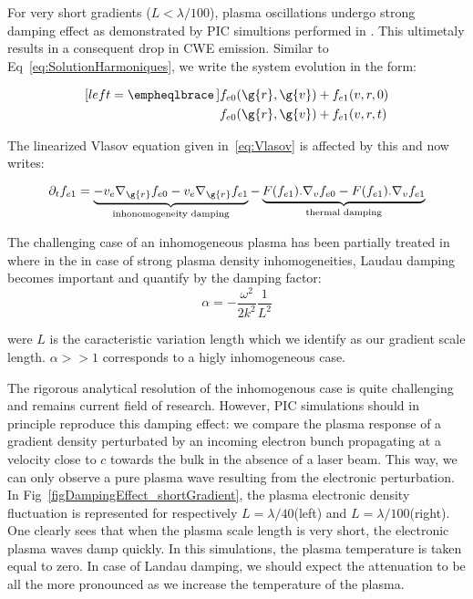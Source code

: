 For very short gradients ($L < \lambda/100$), plasma oscillations undergo strong damping effect as demonstrated by PIC simultions performed in \cite{thaury2010high}. This ultimetaly results in a consequent drop in CWE emission.
Similar to Eq~\ref{eq:SolutionHarmoniques}, we write the system evolution in the form:

\begin{subequations}
\label{eq:SolutionHarmoniquesNH}
\begin{align}[left = \empheqlbrace\,]
&f_{e0}(\g{r},\g{v}) + f_{e1}(v,r,0)\label{eq:SolutionHarmoniquesNH1}\\
&f_{e0}(\g{r},\g{v}) + f_{e1}(v,r,t)\label{eq:SolutionHarmoniquesNH2}
\end{align}
\end{subequations}

\noindent The linearized Vlasov equation given in~\ref{eq:Vlasov} is affected by this and now writes:

\begin{equation}
\label{eq:VlasovNH}
\partial_{t} f_{e1} = \underbrace{-v_e \nabla_{\g{r}} f_{e0} - v_e \nabla_{\g{r}} f_{e1}}_{\text{inhonomogeneity damping}} -  \underbrace{F(f_{e1}).\nabla_{v}f_{e0} - F(f_{e1}).\nabla_{v}f_{e1}}_{\text{thermal damping}}
\end{equation}


\noindent The challenging case of an inhomogeneous plasma has been partially treated in \cite{karpman1974nonlinear,asseo1972effect} where in the in case of strong plasma density inhomogeneities, Laudau damping becomes
important and quantify by the damping factor:
$$
\alpha = -\frac{\omega^2}{2k^2}\frac{1}{L^2}
$$

\noindent were $L$ is the caracteristic variation length which we identify as our gradient scale length. $\alpha >> 1$ corresponds to a higly inhomogeneous case.

\noindent The rigorous analytical resolution of the inhomogenous case is quite challenging and remains current field of research. However, PIC simulations should in principle reproduce this damping effect: we compare the plasma response of a gradient density perturbated by an incoming electron bunch propagating at a velocity close to $c$ towards the bulk in the absence of a laser beam. This way, we can only observe a pure plasma wave resulting from the electronic perturbation. In Fig~\ref{figDampingEffect_shortGradient}, the plasma
electronic density fluctuation is represented for respectively $L=\lambda/40$(left) and $L=\lambda/100$(right).
One clearly sees that when the plasma scale length is very short, the electronic plasma waves damp quickly. In this simulations, the plasma temperature is taken equal to zero. In case of Landau damping, we should 
expect the attenuation to be all the more pronounced as we increase the temperature of the plasma. 


